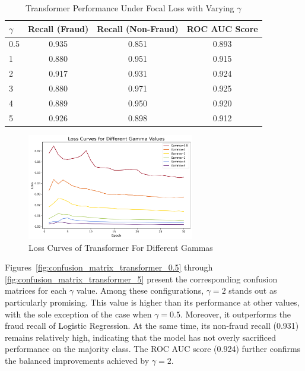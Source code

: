 \documentclass[11pt, oneside]{article}   	%
\begin{document}
\begin{table}[h]
\centering
\caption{Transformer Performance Under Focal Loss with Varying \(\gamma\)}
\label{tab:focal_gamma}
\begin{tabular}{lccc}
\hline
\(\gamma\) & Recall (Fraud) & Recall (Non-Fraud) & ROC AUC Score \\
\hline
0.5 & 0.935 & 0.851 & 0.893 \\
1   & 0.880 & 0.951 & 0.915 \\
2   & 0.917 & 0.931 & 0.924 \\
3   & 0.880 & 0.971 & 0.925 \\
4   & 0.889 & 0.950 & 0.920 \\
5   & 0.926 & 0.898 & 0.912 \\
\hline
\end{tabular}
\end{table}

\begin{figure}[H]
    \centering
    \includegraphics[width=0.65\textwidth]{images/loss_curves_transformer.png}
    \caption{Loss Curves of Transformer For Different Gammas}
    \label{fig:loss_curves_transformer}
\end{figure}

Figures~\ref{fig:confusion_matrix_transformer_0.5} through \ref{fig:confusion_matrix_transformer_5} present the corresponding confusion matrices for each \(\gamma\) value. Among these configurations, \(\gamma = 2\) stands out as particularly promising. This value is higher than its performance at other values, with the sole exception of the case when \(\gamma = 0.5\). Moreover, it outperforms the fraud recall of Logistic Regression. At the same time, its non-fraud recall (0.931) remains relatively high, indicating that the model has not overly sacrificed performance on the majority class. The ROC AUC score (0.924) further confirms the balanced improvements achieved by \(\gamma = 2\).
\end{document}
